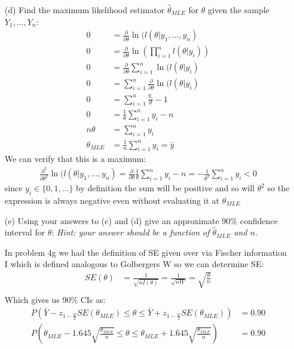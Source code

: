 \documentclass{article}
\newcommand{\1}{\mathbf{1}}
\begin{document}
\begin{itemize}
    \item[(d)]  Find the maximum likelihood estimator $\hat{\theta}_{MLE}$ for $\theta$ given the sample $Y_1,\ldots, Y_n$:
    \begin{align*}
        0 &= \frac{\partial}{\partial\theta} \ln(l(\theta|y_1,\hdots ,y_n) \\
        0 &= \frac{\partial}{\partial\theta} \ln\left( \prod_{i=1}^n l(\theta|y_i) \right) \\
        0 &= \frac{\partial}{\partial\theta} \sum_{i=1}^n \ln(l(\theta|y_i) \\
        0 &= \sum_{i=1}^n \frac{\partial}{\partial\theta} \ln(l(\theta|y_i) \\
        0 &= \sum_{i=1}^n \frac{y_i}{\theta} -1 \\
        0 &= \frac{1}{\theta} \sum_{i=1}^n y_i - n \\
        n\theta  &= \sum_{i=1}^n y_i \\
        \theta_{MLE} &= \frac{1}{n} \sum_{i=1}^n y_i = \bar y 
    \end{align*}
    We can verify that this is a maximum:
    \begin{align*}
        \frac{\partial^2}{\partial\theta^2} \ln(l(\theta|y_1,\hdots ,y_n) =   \frac{\partial}{\partial\theta} \frac{1}{\theta} \sum_{i=1}^n y_i - n = -\frac{1}{\theta^2} \sum_{i=1}^n y_i < 0
    \end{align*}
    since $y_i \in \{0,1,\ldots \}$ by definition the sum will be positive and so will $\theta^2$ so the expression is always negative even without evaluating it at $\theta_{MLE}$

    \item[(e)]  Using your answers to (c) and (d) give an approximate $90\%$ confidence interval for $\theta$: {\it Hint: your answer should be a function of $\hat{\theta}_{MLE}$ and $n$.}
    
    In problem 4g we had the definition of SE given over via Fischer information I which is defined analogous to Golbergers W so we can determine SE:
    \begin{align*}
        SE(\theta) &= \frac{1}{\sqrt{nI(\theta)}} = \frac{1}{\sqrt{nW}} = \sqrt{\frac{\theta}{n}}\\
    \end{align*}
    Which gives us 90\% CIs as:
    \begin{align*}
        P\left(\bar Y - z_{1-\frac{\alpha}{2}}SE(\theta_{MLE}) \leq \theta \leq \bar Y + z_{1-\frac{\alpha}{2}}SE(\theta_{MLE})\right) &= 0.90 \\
        P\left(\theta_{MLE} - 1.645  \sqrt{\frac{\theta_{MLE}}{n}} \leq \theta \leq \theta_{MLE}  + 1.645 \sqrt{\frac{\theta_{MLE}}{n}}\right) &= 0.90
    \end{align*} 
\end{itemize}
\end{document}
